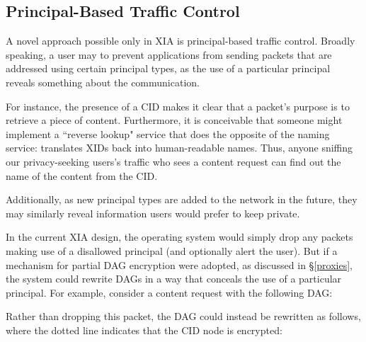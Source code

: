 \documentclass{article}
\newcommand{\entrynode}[1]{
  \SetVertexNormal[Shape      = circle,
                   FillColor  = black,
                   LineWidth  = 0pt,
                   MinSize    = 0pt]
  \Vertex[L={\tiny\,}]{#1}
  \SetVertexNormal[Shape      = circle,
                   FillColor  = white,
                   LineWidth  = 2pt]
}
\newcommand{\encryptednode}[2]{
  \SetVertexNormal[Shape      = circle,
                   FillColor  = white,
                   LineWidth  = 2pt]
  \tikzstyle{VertexStyle}=[dotted, draw, circle]
  \Vertex[#1]{#2}
  \SetVertexNormal[Shape      = circle,
                   FillColor  = white,
                   LineWidth  = 2pt]
}
\begin{document}
\subsection{Principal-Based Traffic Control}
A novel approach possible only in XIA is principal-based traffic control. Broadly speaking, a user may to prevent applications from sending packets that are addressed using certain principal types, as the use of a particular principal reveals something about the communication.

For instance, the presence of a CID makes it clear that a packet's purpose is to retrieve a piece of content. Furthermore, it is conceivable that someone might implement a ``reverse lookup" service that does the opposite of the naming service: translates XIDs back into human-readable names. Thus, anyone sniffing our privacy-seeking users's traffic who sees a content request can find out the name of the content from the CID.

Additionally, as new principal types are added to the network in the future, they may similarly reveal information users would prefer to keep private.

In the current XIA design, the operating system would simply drop any packets making use of a disallowed principal (and optionally alert the user). But if a mechanism for partial DAG encryption were adopted, as discussed in \S\ref{proxies}, the system could rewrite DAGs in a way that conceals the use of a particular principal. For example, consider a content request with the following DAG:
\begin{center}
\end{center}
Rather than dropping this packet, the DAG could instead be rewritten as follows, where the dotted line indicates that the CID node is encrypted:
\begin{center}
\end{center}
\end{document}

